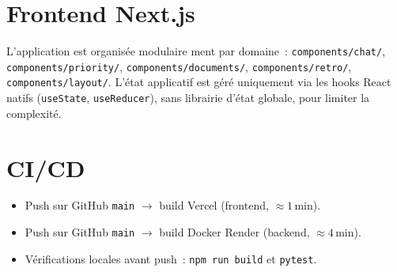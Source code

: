 \section{Frontend Next.js}
L'application est organisée modulaire ment par domaine~:
\texttt{components/chat/}, \texttt{components/priority/},
\texttt{components/documents/}, \texttt{components/retro/},
\texttt{components/layout/}. L'état applicatif est géré uniquement
via les hooks React natifs (\texttt{useState}, \texttt{useReducer}),
sans librairie d'état globale, pour limiter la complexité.

\section{CI/CD}
\begin{itemize}
  \item Push sur GitHub \texttt{main} $\rightarrow$ build Vercel
        (frontend, $\approx 1$\,min).
  \item Push sur GitHub \texttt{main} $\rightarrow$ build Docker
        Render (backend, $\approx 4$\,min).
  \item Vérifications locales avant push~: \texttt{npm run build}
        et \texttt{pytest}.
\end{itemize}
